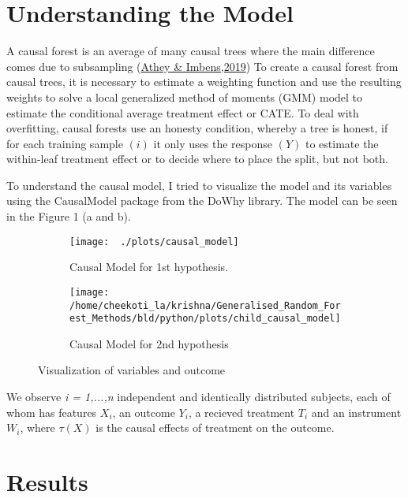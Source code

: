 \documentclass[11pt, a4paper, leqno]{article}
\begin{document}
 \section{Understanding the Model} %
\label{sec:Understanding the Model}

A causal forest is an average of many causal trees where the main difference comes due to subsampling
(\href{https://www.annualreviews.org/doi/abs/10.1146/annurev-economics-080217-053433}{Athey \& Imbens,2019})
To create a causal forest from
causal trees, it is necessary to estimate a weighting function and use the resulting weights to solve a local generalized method of moments (GMM)
model to estimate the conditional average treatment effect or CATE. To deal with overfitting, causal forests use an honesty condition, whereby a
tree is honest, if for each training sample $(i)$ it only uses the response $(Y)$ to estimate the within-leaf treatment effect or to decide where
to place the split, but not both.

To understand the causal model, I tried to visualize the model and its variables using the CausalModel package from the DoWhy library.
The model
can be seen in the Figure 1 (a and b).

\begin{figure}[!tbp]
  \begin{subfigure}[b]{0.5\textwidth}
    \texttt{[image: ~./plots/causal\_model]}
    \caption{Causal Model for 1st hypothesis.}
    \label{fig:f1}
  \end{subfigure}
  \hfill
  \begin{subfigure}[b]{0.5\textwidth}
    \texttt{[image: /home/cheekoti\_la/krishna/Generalised\_Random\_Forest\_Methods/bld/python/plots/child\_causal\_model]}
    \caption{Causal Model for 2nd hypothesis}
    \label{fig:f2}
  \end{subfigure}
  \caption{Visualization of variables and outcome}
\end{figure}

We observe \textit{i = 1,...,n} independent and identically distributed subjects, each of whom has features $X_i$, an outcome $Y_i$, a recieved
treatment $T_i$ and an instrument $W_i$, where $\tau(X)$ is the causal effects of treatment on the outcome.


 \section{Results} %
\label{sec:Results}
\end{document}
